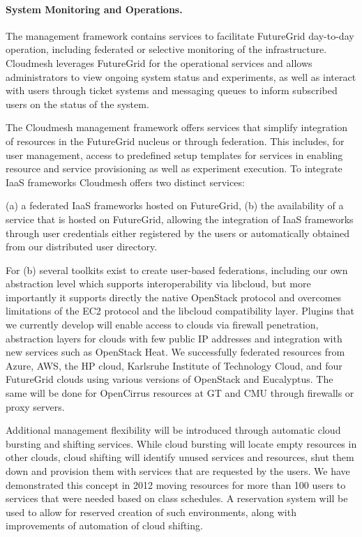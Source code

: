 \documentclass[graybox]{svmult}
\begin{document}
\paragraph{System Monitoring and Operations.}

The management framework contains services to facilitate FutureGrid day-to-day operation, including federated or selective monitoring of the infrastructure. Cloudmesh leverages FutureGrid for the operational services and allows administrators to view ongoing system status and experiments, as well as interact with users through ticket systems and messaging queues to inform subscribed users on the status of the system.

The Cloudmesh management framework offers services that simplify integration of resources in the FutureGrid nucleus or through federation. This includes, for user management, access to predefined setup templates for services in enabling resource and service provisioning as well as experiment execution. To integrate IaaS frameworks Cloudmesh offers two distinct services:

(a) a federated IaaS frameworks hosted on FutureGrid,
(b) the availability of a service that is hosted on FutureGrid, allowing the integration of IaaS frameworks through user credentials either registered by the users or automatically obtained from our distributed user directory.

For (b) several toolkits exist to create user-based federations, including our own abstraction level which supports interoperability via libcloud, but more importantly it supports directly the native OpenStack protocol and overcomes limitations of the EC2 protocol and the libcloud compatibility layer. Plugins that we currently develop will enable access to clouds via firewall penetration, abstraction layers for clouds with few public IP addresses and integration with new services such as OpenStack Heat. We successfully federated resources from Azure, AWS, the HP cloud, Karlsruhe Institute of Technology Cloud, and four FutureGrid clouds using various versions of OpenStack and Eucalyptus. The same will be done for OpenCirrus resources at GT and CMU through firewalls or proxy servers.

Additional management flexibility will be introduced through automatic cloud bursting and shifting services. While cloud bursting will locate empty resources in other clouds, cloud shifting will identify unused services and resources, shut them down and provision them with services that are requested by the users. We have demonstrated this concept in 2012 moving resources for more than 100 users to services that were needed based on class schedules. A reservation system will be used to allow for reserved creation of such environments, along with improvements of automation of cloud shifting.
\end{document}
